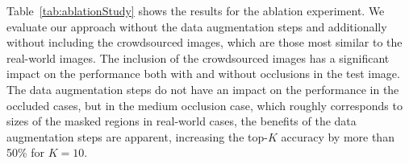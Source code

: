 Table~\ref{tab:ablationStudy} shows the results
for the ablation experiment. We evaluate our approach
without the data augmentation steps and additionally 
without including the crowdsourced images, which are those most similar to the real-world images. The inclusion of the crowdsourced images has a significant impact on the performance both with and without occlusions in the test image. The data augmentation steps do not have an impact on the performance in the occluded cases, but in the medium occlusion case, which roughly corresponds to sizes of the masked regions in real-world cases, the benefits of the data augmentation steps are apparent, increasing the top-$K$ accuracy by more than 50\% for $K=10$.